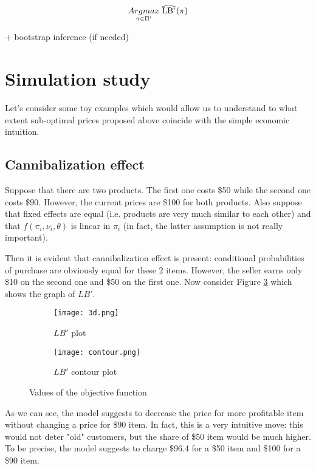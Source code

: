 \documentclass[12pt]{article}
\newcommand\reallywidehat[1]{%
\savestack{\tmpbox}{\stretchto{%
  \scaleto{%
    \scalerel*[\widthof{\ensuremath{#1}}]{\kern-.6pt\bigwedge\kern-.6pt}%
    {\rule[-\textheight/2]{1ex}{\textheight}}%
  }{\textheight}%
}{0.5ex}}%
\stackon[1pt]{#1}{\tmpbox}%
}
\begin{document}
\begin{equation*}
\underset{\pi \in \Pi'}{Argmax} \: \reallywidehat{LB'}(\pi)
\end{equation*}

+ bootstrap inference (if needed)



\section{Simulation study}

Let's consider some toy examples which would allow us to understand to what extent sub-optimal prices proposed above coincide with the simple economic intuition.

\subsection{Cannibalization effect}

Suppose that there are two products.
The first one costs \$50 while the second one costs \$90.
However, the current prices are \$100 for both products.
Also suppose that fixed effects are equal (i.e. products are very much similar to each other) and that $f(\pi_i,\nu_i,\theta)$ is linear in $\pi_i$ (in fact, the latter assumption is not really important).

\par Then it is evident that cannibalization effect is present: conditional probabilities of purchase are obviously equal for these 2 items.
However, the seller earns only \$10 on the second one and \$50 on the first one.
Now consider Figure \ref{fig:figg} which shows the graph of $LB'$.


\begin{figure}[H]
\centering
\begin{subfigure}{0.49\textwidth}
\centering
\texttt{[image: 3d.png]}
\caption{$LB'$ plot}
\label{fig:left}
\end{subfigure}
\begin{subfigure}{0.49\textwidth}
\centering
\texttt{[image: contour.png]}
\caption{$LB'$ contour plot}
\label{fig:right}
\end{subfigure}
\caption{Values of the objective function}
\label{fig:figg}
\end{figure}

As we can see, the model suggests to decrease the price for more profitable item without changing a price for \$90 item.
In fact, this is a very intuitive move: this would not deter "old" customers, but the share of \$50 item would be much higher.
To be precise, the model suggests to charge \$96.4 for a \$50 item and \$100 for a \$90 item. 
\end{document}
